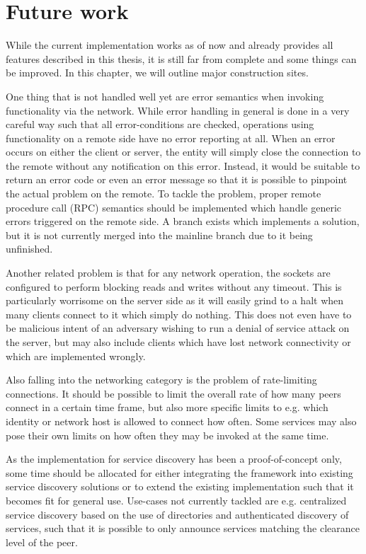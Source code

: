 \chapter{Future work}

While the current implementation works as of now and already provides all features described in this thesis, it is still far from complete and some things can be improved.
In this chapter, we will outline major construction sites.

One thing that is not handled well yet are error semantics when invoking functionality via the network.
While error handling in general is done in a very careful way such that all error-conditions are checked, operations using functionality on a remote side have no error reporting at all.
When an error occurs on either the client or server, the entity will simply close the connection to the remote without any notification on this error.
Instead, it would be suitable to return an error code or even an error message so that it is possible to pinpoint the actual problem on the remote.
To tackle the problem, proper remote procedure call (RPC) semantics should be implemented which handle generic errors triggered on the remote side.
A branch exists which implements a solution, but it is not currently merged into the mainline branch due to it being unfinished.

Another related problem is that for any network operation, the sockets are configured to perform blocking reads and writes without any timeout.
This is particularly worrisome on the server side as it will easily grind to a halt when many clients connect to it which simply do nothing.
This does not even have to be malicious intent of an adversary wishing to run a denial of service attack on the server, but may also include clients which have lost network connectivity or which are implemented wrongly.

Also falling into the networking category is the problem of rate-limiting connections.
It should be possible to limit the overall rate of how many peers connect in a certain time frame, but also more specific limits to e.g. which identity or network host is allowed to connect how often.
Some services may also pose their own limits on how often they may be invoked at the same time.

As the implementation for service discovery has been a proof-of-concept only, some time should be allocated for either integrating the framework into existing service discovery solutions or to extend the existing implementation such that it becomes fit for general use.
Use-cases not currently tackled are e.g. centralized service discovery based on the use of directories and authenticated discovery of services, such that it is possible to only announce services matching the clearance level of the peer.

